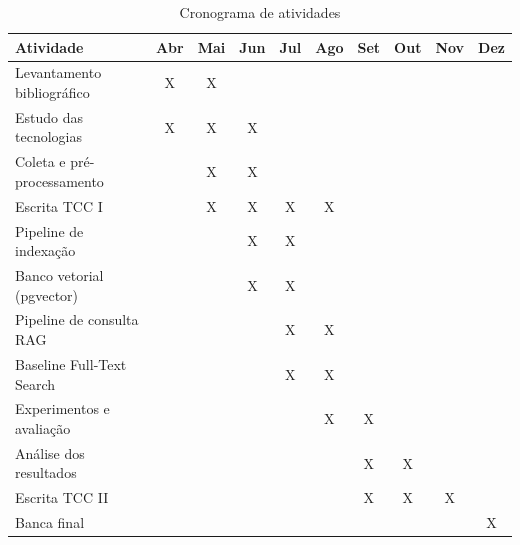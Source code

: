 \documentclass[
  12pt,
  openright,
  twoside,
  a4paper,
  brazil
]{abntex2}
\begin{document}
\begin{table}[htbp]
\centering
\caption{Cronograma de atividades}
\label{tab:cronograma}
\small
\begin{tabularx}{\textwidth}{Xccccccccc}
\toprule
\textbf{Atividade} & \textbf{Abr} & \textbf{Mai} & \textbf{Jun} & \textbf{Jul} & \textbf{Ago} & \textbf{Set} & \textbf{Out} & \textbf{Nov} & \textbf{Dez} \\
\midrule
Levantamento bibliográfico    & X & X &   &   &   &   &   &   &   \\
Estudo das tecnologias         & X & X & X &   &   &   &   &   &   \\
Coleta e pré-processamento     &   & X & X &   &   &   &   &   &   \\
Escrita TCC I                  &   & X & X & X & X &   &   &   &   \\
Pipeline de indexação          &   &   & X & X &   &   &   &   &   \\
Banco vetorial (pgvector)      &   &   & X & X &   &   &   &   &   \\
Pipeline de consulta RAG       &   &   &   & X & X &   &   &   &   \\
Baseline Full-Text Search      &   &   &   & X & X &   &   &   &   \\
Experimentos e avaliação       &   &   &   &   & X & X &   &   &   \\
Análise dos resultados         &   &   &   &   &   & X & X &   &   \\
Escrita TCC II                 &   &   &   &   &   & X & X & X &   \\
Banca final                    &   &   &   &   &   &   &   &   & X \\
\bottomrule
\end{tabularx}
\end{table}

\postextual


\end{document}
